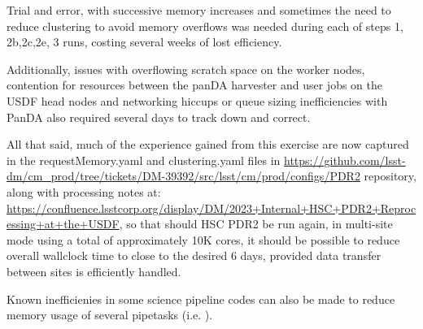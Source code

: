 Trial and error, with successive memory increases and sometimes the need to
reduce clustering to avoid memory overflows was needed during each of
steps 1, 2b,2c,2e, 3 runs, costing several weeks of lost efficiency.

Additionally, issues with overflowing scratch space on the worker nodes,
contention for resources between the panDA harvester and user jobs on the 
USDF head nodes and networking hiccups or queue sizing inefficiencies 
with PanDA also required several days to track down and correct.

All that said, much of the experience gained from this exercise are
now captured in the requestMemory.yaml and clustering.yaml files
in \url{https://github.com/lsst-dm/cm_prod/tree/tickets/DM-39392/src/lsst/cm/prod/configs/PDR2} repository, along with processing notes at:
\url{https://confluence.lsstcorp.org/display/DM/2023+Internal+HSC+PDR2+Reprocessing+at+the+USDF}, so that should HSC PDR2 be run again, in multi-site 
mode using a total of approximately 10K cores, it should be 
possible to reduce overall wallclock time to close to the desired 6 days,
provided data transfer between sites is efficiently handled.

Known inefficienies in some science pipeline codes can also be made to
reduce memory usage of several pipetasks (i.e. ).







